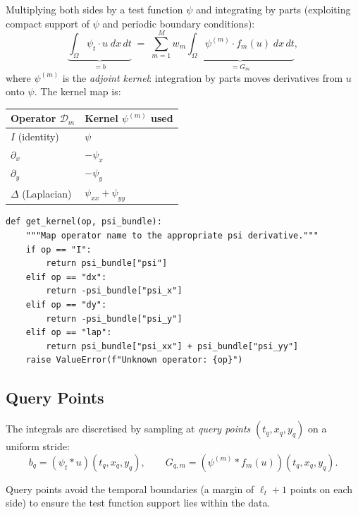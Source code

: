 \documentclass[11pt]{article}
\begin{document}
Multiplying both sides by a test function $\psi$ and integrating by parts
(exploiting compact support of $\psi$ and periodic boundary conditions):
\begin{equation}\label{eq:weak_form}
  \underbrace{\int_\Omega \psi_t \cdot u \;dx\,dt}_{= b}
  \;=\; \sum_{m=1}^M w_m
  \underbrace{\int_\Omega \psi^{(m)} \cdot f_m(u) \;dx\,dt}_{= G_m},
\end{equation}
where $\psi^{(m)}$ is the \emph{adjoint kernel}: integration by parts
moves derivatives from $u$ onto $\psi$.  The kernel map is:
\begin{center}
\begin{tabular}{ll}
\toprule
Operator $\mathcal{D}_m$ & Kernel $\psi^{(m)}$ used \\
\midrule
$I$ (identity) & $\psi$ \\
$\partial_x$   & $-\psi_x$ \\
$\partial_y$   & $-\psi_y$ \\
$\Delta$ (Laplacian) & $\psi_{xx} + \psi_{yy}$ \\
\bottomrule
\end{tabular}
\end{center}

\begin{lstlisting}[caption={system.py --- Kernel mapping}]
def get_kernel(op, psi_bundle):
    """Map operator name to the appropriate psi derivative."""
    if op == "I":
        return psi_bundle["psi"]
    elif op == "dx":
        return -psi_bundle["psi_x"]
    elif op == "dy":
        return -psi_bundle["psi_y"]
    elif op == "lap":
        return psi_bundle["psi_xx"] + psi_bundle["psi_yy"]
    raise ValueError(f"Unknown operator: {op}")
\end{lstlisting}


\subsection{Query Points}

The integrals are discretised by sampling at \emph{query points}
$(t_q, x_q, y_q)$  on a uniform stride:
\begin{equation}
  b_q = (\psi_t * u)(t_q, x_q, y_q),
  \qquad
  G_{q,m} = (\psi^{(m)} * f_m(u))(t_q, x_q, y_q).
\end{equation}

Query points avoid the temporal boundaries (a margin of $\ell_t + 1$
points on each side) to ensure the test function support lies within
the data.
\end{document}

